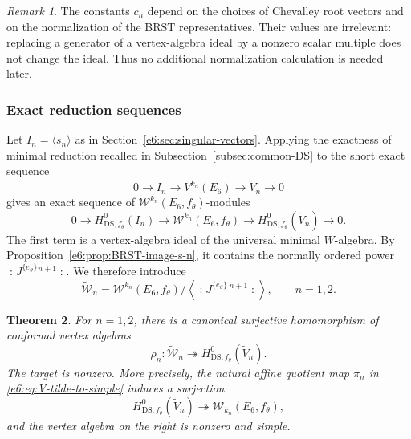 \documentclass[11pt,reqno]{amsart}
\newtheorem{theorem}{Theorem}[section]
\theoremstyle{definition}
\theoremstyle{remark}
\newtheorem{remark}[theorem]{Remark}
\begin{document}
\begin{remark}
The constants $c_n$ depend on the choices of Chevalley root vectors and on the
normalization of the BRST representatives.  Their values are irrelevant: replacing
a generator of a vertex-algebra ideal by a nonzero scalar multiple does not change
the ideal.  Thus no additional normalization calculation is needed later.
\end{remark}

\subsubsection{Exact reduction sequences}


Let $I_n=\langle s_n\rangle$ as in Section~\ref{e6:sec:singular-vectors}.  Applying the exactness of minimal reduction recalled in
Subsection~\ref{subsec:common-DS} to the short exact sequence
\[
  0\longrightarrow I_n
   \longrightarrow V^{k_n}(E_6)
   \longrightarrow \widetilde V_n
   \longrightarrow0
\]
gives an exact sequence of
$\mathcal W^{k_n}(E_6,f_\theta)$-modules
\begin{equation}\label{e6:eq:DS-exact-sequence-I-n}
  0\longrightarrow H^0_{\mathrm{DS},f_\theta}(I_n)
   \longrightarrow \mathcal W^{k_n}(E_6,f_\theta)
   \longrightarrow
   H^0_{\mathrm{DS},f_\theta}(\widetilde V_n)
   \longrightarrow0.
\end{equation}
The first term is a vertex-algebra ideal of the universal minimal $W$-algebra.
By Proposition~\ref{e6:prop:BRST-image-s-n}, it contains the normally ordered power
$\mathopen{:}J^{\{e_\vartheta\}}{}^{n+1}\mathclose{:}$.  We therefore introduce
\begin{equation}\label{e6:eq:def-W-tilde-n}
  \widetilde{\mathcal W}_n
  =\mathcal W^{k_n}(E_6,f_\theta)
   \Big/
   \left\langle
     \mathopen{:}J^{\{e_\vartheta\}}{}^{\,n+1}\mathclose{:}
   \right\rangle,
  \qquad n=1,2.
\end{equation}

\begin{theorem}\label{e6:thm:canonical-surjection-reduction}
For $n=1,2$, there is a canonical surjective homomorphism of conformal vertex
algebras
\begin{equation}\label{e6:eq:rho-n}
  \rho_n:\widetilde{\mathcal W}_n
  \twoheadrightarrow
  H^0_{\mathrm{DS},f_\theta}(\widetilde V_n).
\end{equation}
The target is nonzero.  More precisely, the natural affine quotient map
$\pi_n$ in \eqref{e6:eq:V-tilde-to-simple} induces a surjection
\begin{equation}\label{e6:eq:reduced-map-to-simple-W}
  H^0_{\mathrm{DS},f_\theta}(\widetilde V_n)
  \twoheadrightarrow
  \mathcal W_{k_n}(E_6,f_\theta),
\end{equation}
and the vertex algebra on the right is nonzero and simple.
\end{theorem}
\end{document}
